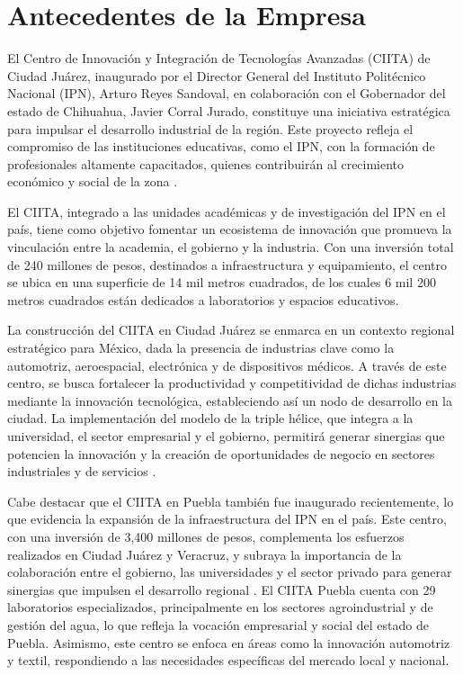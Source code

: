 \section{Antecedentes de la Empresa}

El Centro de Innovación y Integración de Tecnologías Avanzadas (CIITA) de Ciudad Juárez, inaugurado por el Director General del Instituto Politécnico Nacional (IPN), Arturo Reyes Sandoval, en colaboración con el Gobernador del estado de Chihuahua, Javier Corral Jurado, constituye una iniciativa estratégica para impulsar el desarrollo industrial de la región. Este proyecto refleja el compromiso de las instituciones educativas, como el IPN, con la formación de profesionales altamente capacitados, quienes contribuirán al crecimiento económico y social de la zona \cite{ipn_inauguracion_citta_juarez}.

El CIITA, integrado a las unidades académicas y de investigación del IPN en el país, tiene como objetivo fomentar un ecosistema de innovación que promueva la vinculación entre la academia, el gobierno y la industria. Con una inversión total de 240 millones de pesos, destinados a infraestructura y equipamiento, el centro se ubica en una superficie de 14 mil metros cuadrados, de los cuales 6 mil 200 metros cuadrados están dedicados a laboratorios y espacios educativos.

La construcción del CIITA en Ciudad Juárez se enmarca en un contexto regional estratégico para México, dada la presencia de industrias clave como la automotriz, aeroespacial, electrónica y de dispositivos médicos. A través de este centro, se busca fortalecer la productividad y competitividad de dichas industrias mediante la innovación tecnológica, estableciendo así un nodo de desarrollo en la ciudad. La implementación del modelo de la triple hélice, que integra a la universidad, el sector empresarial y el gobierno, permitirá generar sinergias que potencien la innovación y la creación de oportunidades de negocio en sectores industriales y de servicios \cite{ipn_inauguracion_citta_juarez}.

Cabe destacar que el CIITA en Puebla también fue inaugurado recientemente, lo que evidencia la expansión de la infraestructura del IPN en el país. Este centro, con una inversión de 3,400 millones de pesos, complementa los esfuerzos realizados en Ciudad Juárez y Veracruz, y subraya la importancia de la colaboración entre el gobierno, las universidades y el sector privado para generar sinergias que impulsen el desarrollo regional \cite{diario_cambio_citta_puebla}. El CIITA Puebla cuenta con 29 laboratorios especializados, principalmente en los sectores agroindustrial y de gestión del agua, lo que refleja la vocación empresarial y social del estado de Puebla. Asimismo, este centro se enfoca en áreas como la innovación automotriz y textil, respondiendo a las necesidades específicas del mercado local y nacional.

